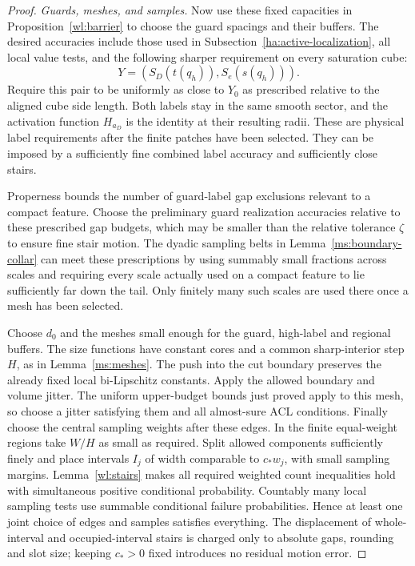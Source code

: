 \begin{proof}
\emph{Guards, meshes, and samples.}
Now use these fixed capacities in Proposition~\ref{wl:barrier} to choose
the guard spacings and their buffers.  The desired accuracies include
those used in Subsection~\ref{ha:active-localization}, all local value tests,
and the following sharper requirement on every saturation cube:
\begin{equation}\label{ha:sharp-label-pinning}
                  Y=(S_D(t(q_h)),S_e(s(q_h))).
\end{equation}
Require this pair to be uniformly as close to $Y_0$ as prescribed
relative to the aligned cube side length.  Both labels stay in the
same smooth sector, and the activation
function $H_{a_D}$ is the identity at their resulting radii.
These are physical label requirements after the finite patches
have been selected.  They can be imposed by a sufficiently fine
combined label accuracy and sufficiently close stairs.

Properness bounds the number of guard-label gap exclusions relevant
to a compact feature.  Choose the preliminary guard realization
accuracies relative to these prescribed gap budgets, which may be
smaller than the relative tolerance $\zeta$ to ensure fine stair
motion.  The dyadic sampling belts in
Lemma~\ref{ms:boundary-collar} can meet these prescriptions by
using summably small fractions across scales and requiring every
scale actually used on a compact feature to lie sufficiently far
down the tail.  Only finitely many such scales are used there
once a mesh has been selected.

Choose $d_0$ and the meshes small enough for the guard, high-label
and regional buffers.  The size functions have constant cores and
a common sharp-interior step $H$, as in Lemma~\ref{ms:meshes}.
The push into the cut boundary preserves the already fixed local
bi-Lipschitz constants.  Apply the allowed boundary and volume
jitter.  The uniform upper-budget bounds just proved apply to this
mesh, so choose a jitter satisfying them and all almost-sure ACL
conditions.  Finally choose the central sampling weights after
these edges.  In the finite equal-weight regions take $W/H$ as
small as required.  Split allowed components sufficiently finely
and place intervals $I_j$ of width comparable to $c_*w_j$, with
small sampling margins.  Lemma~\ref{wl:stairs} makes all required
weighted count inequalities hold with simultaneous positive
conditional probability.  Countably many local sampling tests
use summable conditional failure probabilities.  Hence at least
one joint choice of edges and samples satisfies everything.
The displacement of whole-interval and occupied-interval stairs
is charged only to absolute gaps, rounding and slot size; keeping
$c_*>0$ fixed introduces no residual motion error.


\end{proof}

